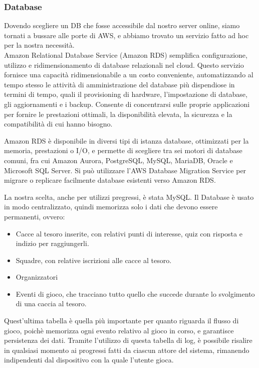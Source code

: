 \documentclass[12pt, italian]{article}
\begin{document}
\subsubsection{Database}
Dovendo scegliere un DB che fosse accessibile dal nostro server online, siamo tornati a bussare alle porte di AWS, e abbiamo trovato un servizio fatto ad hoc per la nostra necessità.\\
Amazon Relational Database Service (Amazon RDS) semplifica configurazione, utilizzo e ridimensionamento di database relazionali nel cloud. Questo servizio fornisce una capacità ridimensionabile a un costo conveniente, automatizzando al tempo stesso le attività di amministrazione del database più dispendiose in termini di tempo, quali il provisioning di hardware, l'impostazione di database, gli aggiornamenti e i backup. Consente di concentrarsi sulle proprie applicazioni per fornire le prestazioni ottimali, la disponibilità elevata, la sicurezza e la compatibilità di cui hanno bisogno.

Amazon RDS è disponibile in diversi tipi di istanza database, ottimizzati per la memoria, prestazioni o I/O, e permette di scegliere tra sei motori di database comuni, fra cui Amazon Aurora, PostgreSQL, MySQL, MariaDB, Oracle e Microsoft SQL Server. Si può utilizzare l'AWS Database Migration Service per migrare o replicare facilmente database esistenti verso Amazon RDS.

La nostra scelta, anche per utilizzi pregressi, è stata MySQL. Il Database è usato in modo centralizzato, quindi memorizza solo i dati che devono essere permanenti, ovvero:
\begin{itemize}
	\item Cacce al tesoro inserite, con relativi punti di interesse, quiz con risposta e indizio per raggiungerli.
	\item Squadre, con relative iscrizioni alle cacce al tesoro. 
	\item Organizzatori
	\item Eventi di gioco, che tracciano tutto quello che succede durante lo svolgimento di una caccia al tesoro.
\end{itemize}

Quest'ultima tabella è quella più importante per quanto riguarda il flusso di gioco, poichè memorizza ogni evento relativo al gioco in corso, e garantisce persistenza dei dati. Tramite l'utilizzo di questa tabella di log, è possibile risalire in qualsiasi momento ai progressi fatti da ciascun attore del sistema, rimanendo indipendenti dal dispositivo con la quale l'utente gioca.
\end{document}
